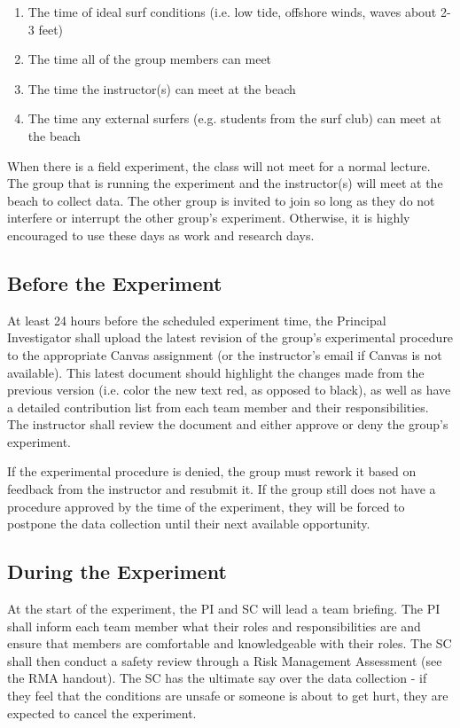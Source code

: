 \documentclass[
	letterpaper, %
	fontsize=10pt, %
	twoside=true, %
	numbers=noenddot, %
]{kaobook}
\begin{document}
\begin{enumerate}
    \item The time of ideal surf conditions (i.e. low tide, offshore winds, waves about 2-3 feet)
    \item The time all of the group members can meet
    \item The time the instructor(s) can meet at the beach
    \item The time any external surfers (e.g. students from the surf club) can meet at the beach 
\end{enumerate}

When there is a field experiment, the class will not meet for a normal lecture.
The group that is running the experiment and the instructor(s) will meet at the beach to collect data.
The other group is invited to join so long as they do not interfere or interrupt the other group's experiment.
Otherwise, it is highly encouraged to use these days as work and research days.

\subsection*{Before the Experiment}
At least 24 hours before the scheduled experiment time, the Principal Investigator shall upload the latest revision of the group's experimental procedure to the appropriate Canvas assignment (or the instructor's email if Canvas is not available).
This latest document should highlight the changes made from the previous version (i.e. color the new text red, as opposed to black), as well as have a detailed contribution list from each team member and their responsibilities.
The instructor shall review the document and either approve or deny the group's experiment.

If the experimental procedure is denied, the group must rework it based on feedback from the instructor and resubmit it.
If the group still does not have a procedure approved by the time of the experiment, they will be forced to postpone the data collection until their next available opportunity.

\subsection*{During the Experiment}
At the start of the experiment, the PI and SC will lead a team briefing.
The PI shall inform each team member what their roles and responsibilities are and ensure that members are comfortable and knowledgeable with their roles.
The SC shall then conduct a safety review through a Risk Management Assessment (see the RMA handout).
The SC has the ultimate say over the data collection - if they feel that the conditions are unsafe or someone is about to get hurt, they are expected to cancel the experiment.
\end{document}
